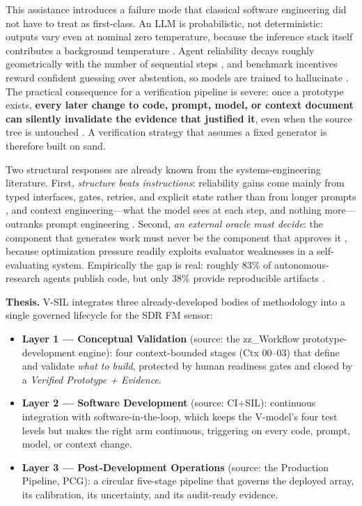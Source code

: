\documentclass[11pt,a4paper]{article}
\begin{document}
This assistance introduces a failure mode that classical software engineering did not have to
treat as first-class. An LLM is probabilistic, not deterministic: outputs vary even at nominal
zero temperature, because the inference stack itself contributes a background temperature
\cite{pith2026}. Agent reliability decays roughly geometrically with the number of sequential
steps \cite{mittal2026}, and benchmark incentives reward confident guessing over abstention, so
models are trained to hallucinate \cite{kalai2026}. The practical consequence for a verification
pipeline is severe: once a prototype exists, \textbf{every later change to code, prompt, model,
or context document can silently invalidate the evidence that justified it}, even when the
source tree is untouched \cite{mittal2026,kalai2026}. A verification strategy that assumes a
fixed generator is therefore built on sand.

Two structural responses are already known from the systems-engineering literature. First,
\emph{structure beats instructions}: reliability gains come mainly from typed interfaces, gates,
retries, and explicit state rather than from longer prompts \cite{nerd2026}, and context
engineering---what the model sees at each step, and nothing more---outranks prompt engineering
\cite{anthropic2026}. Second, \emph{an external oracle must decide}: the component that generates
work must never be the component that approves it \cite{judge2026}, because optimization pressure
readily exploits evaluator weaknesses in a self-evaluating system. Empirically the gap is real:
roughly 83\% of autonomous-research agents publish code, but only 38\% provide reproducible
artifacts \cite{verifgap2026}.

\textbf{Thesis.} V-SIL integrates three already-developed bodies of methodology into a single
governed lifecycle for the SDR FM sensor:

\begin{itemize}
  \item \textbf{Layer 1 --- Conceptual Validation} (source: the zz\_Workflow
    prototype-development engine): four context-bounded stages (Ctx 00--03) that define and
    validate \emph{what to build}, protected by human readiness gates and closed by a
    \emph{Verified Prototype + Evidence}.
  \item \textbf{Layer 2 --- Software Development} (source: CI+SIL): continuous integration with
    software-in-the-loop, which keeps the V-model's four test levels but makes the right arm
    continuous, triggering on every code, prompt, model, or context change.
  \item \textbf{Layer 3 --- Post-Development Operations} (source: the Production Pipeline, PCG):
    a circular five-stage pipeline that governs the deployed array, its calibration, its
    uncertainty, and its audit-ready evidence.
\end{itemize}
\end{document}
